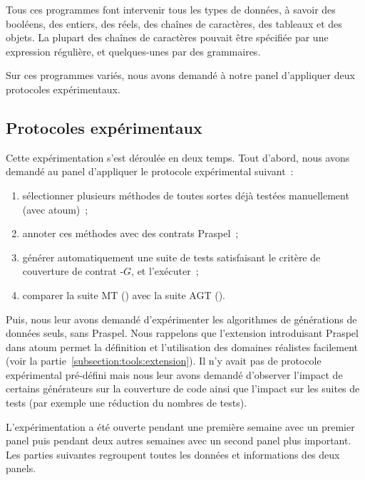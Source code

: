 Tous ces programmes font intervenir tous les types de données, à savoir des
booléens, des entiers, des réels, des chaînes de caractères, des tableaux et des
objets. La plupart des chaînes de caractères pouvait être spécifiée par une
expression régulière, et quelques-unes par des grammaires.

Sur ces programmes variés, nous avons demandé à notre panel d'appliquer deux
protocoles expérimentaux.

\subsection{Protocoles expérimentaux}
\label{subsection:experimentation:modus_operandi}

Cette expérimentation s'est déroulée en deux temps. Tout d'abord, nous avons
demandé au panel d'appliquer le protocole expérimental suivant~:
%
\begin{enumerate}

\item sélectionner plusieurs méthodes de toutes sortes déjà testées
manuellement (avec atoum)~;

\item annoter ces méthodes avec des contrats Praspel~;

\item générer automatiquement une suite de tests satisfaisant le critère de
couverture de contrat -$G$, et l'exécuter~;

\item comparer la suite MT () avec la suite AGT
().

\end{enumerate}

Puis, nous leur avons demandé d'expérimenter les algorithmes de générations de
données seuls, sans Praspel. Nous rappelons que l'extension introduisant Praspel
dans atoum permet la définition et l'utilisation des domaines réalistes
facilement (voir la partie~\ref{subsection:tools:extension}). Il n'y avait pas
de protocole expérimental pré-défini mais nous leur avons demandé d'observer
l'impact de certains générateurs sur la couverture de code ainsi que l'impact
sur les suites de tests (par exemple une réduction du nombres de tests).

L'expérimentation a été ouverte pendant une première semaine avec un premier
panel puis pendant deux autres semaines avec un second panel plus important. Les
parties suivantes regroupent toutes les données et informations des deux panels.

